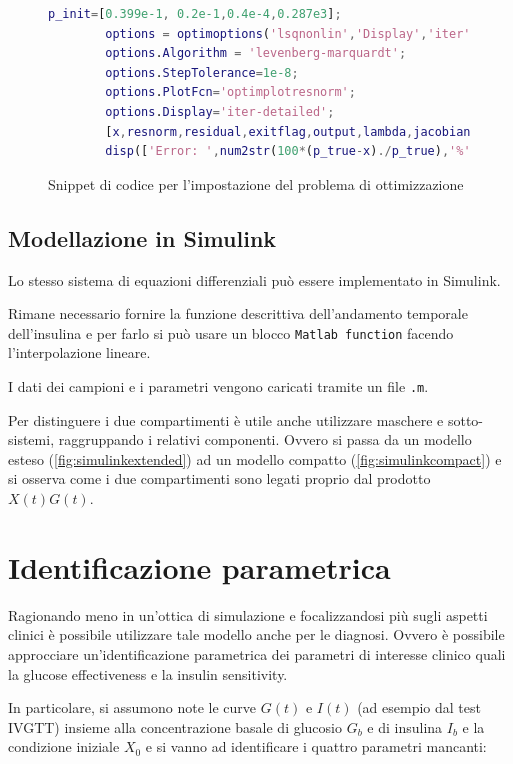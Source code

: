 \begin{figure}[t!]
	\begin{lstlisting}[language=matlab]
		p_init=[0.399e-1, 0.2e-1,0.4e-4,0.287e3]; 
		options = optimoptions('lsqnonlin','Display','iter');
		options.Algorithm = 'levenberg-marquardt';
		options.StepTolerance=1e-8;
		options.PlotFcn='optimplotresnorm';
		options.Display='iter-detailed';
		[x,resnorm,residual,exitflag,output,lambda,jacobian] = lsqnonlin(@optfcn,p_init,[],[],options);	
		disp(['Error: ',num2str(100*(p_true-x)./p_true),'%'])
	\end{lstlisting}
	\caption{Snippet di codice per l'impostazione del problema di ottimizzazione}
	\label{fig:code3}
\end{figure}


\subsection{Modellazione in Simulink}

Lo stesso sistema di equazioni differenziali può essere implementato in Simulink.

Rimane necessario fornire la funzione descrittiva dell'andamento temporale dell'insulina e per farlo si può usare un blocco \texttt{Matlab function} facendo l'interpolazione lineare.



I dati dei campioni e i parametri vengono caricati tramite un file \texttt{.m}.

Per distinguere i due compartimenti è utile anche utilizzare maschere e sotto-sistemi, raggruppando i relativi componenti. Ovvero si passa da un modello esteso (\cref{fig:simulinkextended}) ad un modello compatto (\cref{fig:simulinkcompact}) e si osserva come i due compartimenti sono legati proprio dal prodotto $X(t)G(t)$. 


\section{Identificazione parametrica}



Ragionando meno in un'ottica di simulazione e focalizzandosi più sugli aspetti clinici è possibile utilizzare tale modello anche per le diagnosi.  Ovvero è possibile approcciare un'identificazione parametrica dei parametri di interesse clinico quali la glucose effectiveness e la insulin sensitivity.

In particolare, si assumono note le curve $G(t)$ e $I(t)$ (ad esempio dal test IVGTT) insieme alla concentrazione basale di glucosio $G_b$ e di insulina $I_b$ e la condizione iniziale $X_0$ e si vanno ad identificare i quattro parametri mancanti:

